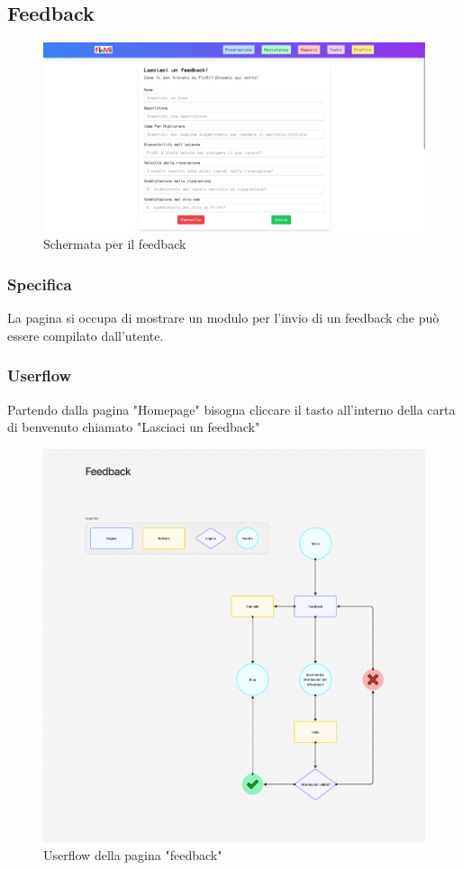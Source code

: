 \documentclass{report}
\begin{document}
\subsection{Feedback}

\begin{figure}[H]
	\centering\includegraphics[width=1\textwidth]{images/microservizio-home/frontend/feedback.jpg}
	\caption{Schermata per il feedback}
\end{figure}
\subsubsection*{Specifica}
La pagina si occupa di mostrare un modulo per l'invio di un feedback che può essere compilato dall'utente.\\ 

\subsubsection*{Userflow}
Partendo dalla pagina "Homepage" bisogna cliccare il tasto all'interno della carta di benvenuto chiamato "Lasciaci un feedback"
\begin{figure}[H]
	\centering\includegraphics[width=1\textwidth]{images/microservizio-home/frontend/feedback-userflow.png}
	Userflow della pagina "feedback"
\end{figure}
\end{document}
